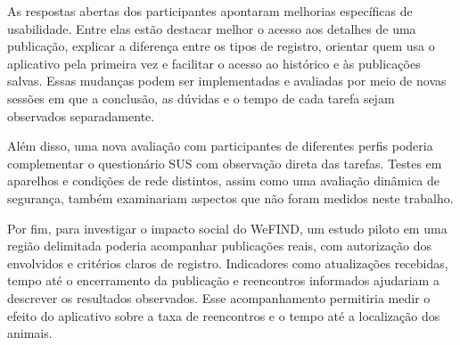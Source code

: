 As respostas abertas dos participantes apontaram melhorias específicas de usabilidade. Entre elas estão destacar melhor o acesso aos detalhes de uma publicação, explicar a diferença entre os tipos de registro, orientar quem usa o aplicativo pela primeira vez e facilitar o acesso ao histórico e às publicações salvas. Essas mudanças podem ser implementadas e avaliadas por meio de novas sessões em que a conclusão, as dúvidas e o tempo de cada tarefa sejam observados separadamente.

Além disso, uma nova avaliação com participantes de diferentes perfis poderia complementar o questionário SUS com observação direta das tarefas. Testes em aparelhos e condições de rede distintos, assim como uma avaliação dinâmica de segurança, também examinariam aspectos que não foram medidos neste trabalho.

Por fim, para investigar o impacto social do WeFIND, um estudo piloto em uma região delimitada poderia acompanhar publicações reais, com autorização dos envolvidos e critérios claros de registro. Indicadores como atualizações recebidas, tempo até o encerramento da publicação e reencontros informados ajudariam a descrever os resultados observados. Esse acompanhamento permitiria medir o efeito do aplicativo sobre a taxa de reencontros e o tempo até a localização dos animais.

